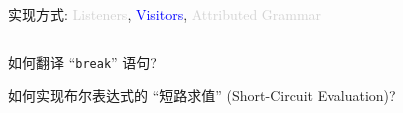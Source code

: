 \begin{frame}
  \begin{center}
    实现方式: \textcolor{lightgray}{Listeners},
      \textcolor{blue}{Visitors},
      \textcolor{lightgray}{Attributed Grammar}
  \end{center}

  \begin{columns}
  \end{columns}

  \begin{center}
  \end{center}
\end{frame}

\begin{frame}
  \begin{center}

    \vspace{0.50cm}
    如何翻译 ``\texttt{break}'' 语句?
  \end{center}
\end{frame}

\begin{frame}
  \begin{center}

    \vspace{0.20cm}
    如何实现布尔表达式的 ``短路求值'' (Short-Circuit Evaluation)?
  \end{center}
\end{frame}
